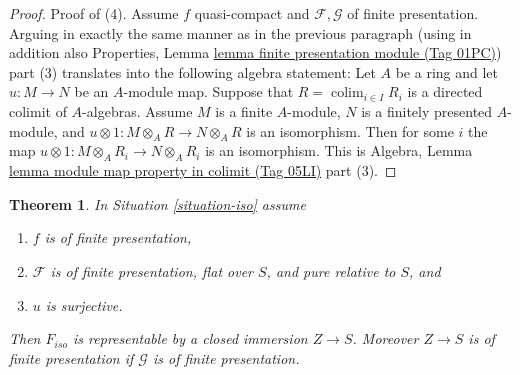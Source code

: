 \documentclass{amsart}
\theoremstyle{plain}
\newtheorem{theorem}[subsection]{Theorem}
\theoremstyle{definition}
\theoremstyle{remark}
\numberwithin{equation}{subsection}
\def\colim{\mathop{\mathrm{colim}}\nolimits}
\begin{document}
\begin{proof}
\medskip\noindent
Proof of (4).
Assume $f$ quasi-compact and $\mathcal{F}, \mathcal{G}$ of finite presentation.
Arguing in exactly the same manner as in the previous paragraph
(using in addition also
Properties, Lemma \href{https://stacks.math.columbia.edu/tag/01PC}{lemma finite presentation module (Tag 01PC)})
part (3) translates into the following algebra statement:
Let $A$ be a ring and let $u : M \to N$ be an $A$-module map.
Suppose that $R = \colim_{i \in I} R_i$ is a directed colimit
of $A$-algebras. Assume $M$ is a finite $A$-module, $N$ is a finitely
presented $A$-module, and
$u \otimes 1 : M \otimes_A R \to N \otimes_A R$ is an isomorphism.
Then for some $i$ the map
$u \otimes 1 : M \otimes_A R_i \to N \otimes_A R_i$ is an isomorphism.
This is
Algebra, Lemma \href{https://stacks.math.columbia.edu/tag/05LI}{lemma module map property in colimit (Tag 05LI)} part (3).
\end{proof}


\begin{theorem}
\label{theorem-flattening-map}
In
Situation \ref{situation-iso}
assume
\begin{enumerate}
\item $f$ is of finite presentation,
\item $\mathcal{F}$ is of finite presentation, flat over $S$, and
pure relative to $S$, and
\item $u$ is surjective.
\end{enumerate}
Then $F_{iso}$ is representable by a closed immersion $Z \to S$.
Moreover $Z \to S$ is of finite presentation if $\mathcal{G}$ is
of finite presentation.
\end{theorem}
\end{document}
